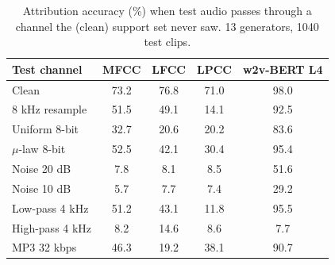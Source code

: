 \begin{table}[t]
\centering\small
\caption{Attribution accuracy (\%) when test audio passes through a channel the (clean) support set never saw. 13 generators, 1040 test clips.}
\label{tab:robust}
\begin{tabular}{lcccc}
\toprule
Test channel & MFCC & LFCC & LPCC & w2v-BERT L4 \\
\midrule
Clean & 73.2 & 76.8 & 71.0 & 98.0 \\
8 kHz resample & 51.5 & 49.1 & 14.1 & 92.5 \\
Uniform 8-bit & 32.7 & 20.6 & 20.2 & 83.6 \\
$\mu$-law 8-bit & 52.5 & 42.1 & 30.4 & 95.4 \\
Noise 20 dB & 7.8 & 8.1 & 8.5 & 51.6 \\
Noise 10 dB & 5.7 & 7.7 & 7.4 & 29.2 \\
Low-pass 4 kHz & 51.2 & 43.1 & 11.8 & 95.5 \\
High-pass 4 kHz & 8.2 & 14.6 & 8.6 & 7.7 \\
MP3 32 kbps & 46.3 & 19.2 & 38.1 & 90.7 \\
\bottomrule
\end{tabular}
\end{table}